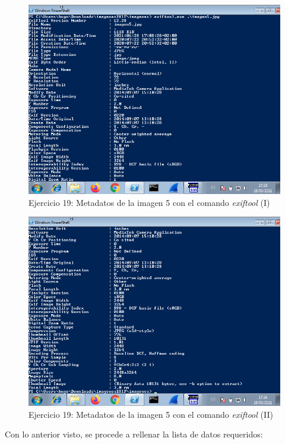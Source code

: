 \documentclass[11pt]{article}
\begin{document}
\begin{figure}[H]
    \caption{Ejercicio 19: Metadatos de la imagen 5 con el comando \textit{exiftool} (I)}
    \centering
    \includegraphics[scale=0.7]{p03/e19-11.png}
\end{figure}

\begin{figure}[H]
    \caption{Ejercicio 19: Metadatos de la imagen 5 con el comando \textit{exiftool} (II)}
    \centering
    \includegraphics[scale=0.7]{p03/e19-12.png}
\end{figure}

Con lo anterior visto, se procede a rellenar la lista de datos requeridos:
\end{document}
